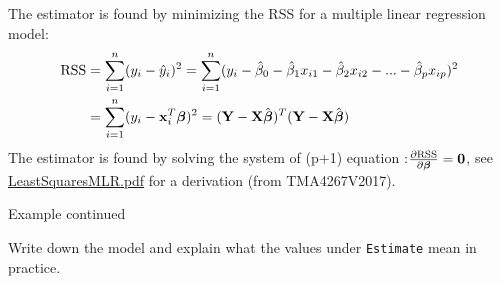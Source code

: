 \documentclass[10pt,ignorenonframetext,]{beamer}
\begin{document}
\begin{frame}

The estimator is found by minimizing the RSS for a multiple linear
regression model:
\[\begin{aligned} \text{RSS} &=\sum_{i=1}^n (y_i - \hat y_i)^2 = \sum_{i=1}^n (y_i - \hat \beta_0 - \hat \beta_1 x_{i1} - \hat \beta_2 x_{i2} -...-\hat \beta_p x_{ip} )^2 \\
&= \sum_{i=1}^n (y_i-{\bf x}_i^T \boldsymbol \beta)^2=({\bf Y}-{\bf X}\hat{\boldsymbol{\beta}})^T({\bf Y}-{\bf X}\hat{\boldsymbol{\beta}})\end{aligned}\]
The estimator is found by solving the system of (p+1) equation
:\(\frac{\partial \text{RSS}}{\partial \boldsymbol \beta}={\bf 0}\), see
\href{https://www.math.ntnu.no/emner/TMA4268/2018v/notes/LeastSquaresMLR.pdf}{LeastSquaresMLR.pdf}
for a derivation (from TMA4267V2017).

\end{frame}

\begin{frame}[fragile]

\begin{block}{Example continued}

Write down the model and explain what the values under \texttt{Estimate}
mean in practice.

\end{block}

\end{frame}
\end{document}
